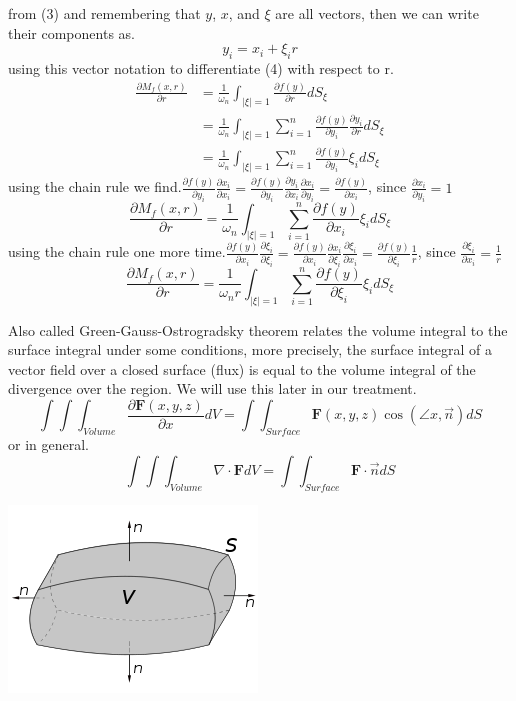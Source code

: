 \documentclass[]{article}
\begin{document}
from (3) and remembering that $y$, $x$, and $\xi$ are all vectors, then we can write their components as.
\[
    y_i = x_i + \xi_i r    
\]
using this vector notation to differentiate (4) with respect to r.
\begin{align*}
\frac{\partial M_f (x,r)}{\partial r} &= \frac{1}{\omega_n} \int_{|\xi|=1} \frac{\partial f(y)}{\partial r}dS_\xi
\\
&= \frac{1}{\omega_n} \int_{|\xi|=1} \sum_{i=1}^{n} \frac{\partial f(y)}{\partial y_i}\frac{\partial y_i}{\partial r} dS_\xi
\\
&= \frac{1}{\omega_n} \int_{|\xi|=1} \sum_{i=1}^{n} \frac{\partial f(y)}{\partial y_i}\xi_i dS_\xi
\end{align*}
using the chain rule we find.$\displaystyle \frac{\partial f(y)}{\partial y_i} \frac{\partial x_i}{\partial x_i} = \frac{\partial f(y)}{\partial y_i} \frac{\partial y_i}{\partial x_i}\frac{\partial x_i}{\partial y_i} = \frac{\partial f(y)}{\partial x_i}$, since $\displaystyle \frac{\partial x_i}{\partial y_i} = 1$
\[
    \frac{\partial M_f (x,r)}{\partial r} = \frac{1}{\omega_n} \int_{|\xi|=1} \sum_{i=1}^{n} \frac{\partial f(y)}{\partial x_i}\xi_i dS_\xi    
\]
using the chain rule one more time.$\displaystyle \frac{\partial f(y)}{\partial x_i} \frac{\partial \xi_i}{\partial \xi_i}= \frac{\partial f(y)}{\partial x_i}\frac{\partial x_i}{\partial \xi_i}\frac{\partial \xi_i}{\partial x_i} = \frac{\partial f(y)}{\partial \xi_i}\frac{1}{r}$, since $\displaystyle \frac{\partial \xi_i}{\partial x_i} = \frac{1}{r}$
\begin{equation}
\frac{\partial M_f (x,r)}{\partial r} = \frac{1}{\omega_n r} \int_{|\xi|=1} \sum_{i=1}^{n} \frac{\partial f(y)}{\partial \xi_i}\xi_i dS_\xi
\end{equation}
\begin{theorem}
    Also called Green-Gauss-Ostrogradsky theorem relates the volume integral to the surface integral under some conditions, more precisely, the surface integral of a vector field over a closed surface (flux) is equal to the volume integral of the divergence over the region. We will use this later in our treatment.
    \[
        \int\int\int_{Volume} \frac{\partial \textbf{F}(x,y,z)}{\partial x}dV = \int\int_{Surface} \textbf{F}(x,y,z)\cos(\angle x,\vec{n}) dS    
    \]
    or in general.
    \[
        \int\int\int_{Volume} \nabla \cdot \textbf{F} dV = \int\int_{Surface} \textbf{F}\cdot \vec{n} dS
    \]
    \begin{center}
    \includegraphics[scale=0.6]{div.png}
    \end{center}
\end{theorem}
\end{document}
